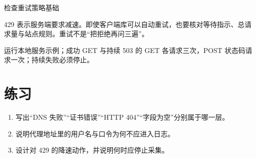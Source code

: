 \begin{example}{检查重试策略}{基础}
\end{example}

\begin{warning}
429 表示服务端要求减速。即使客户端库可以自动重试，也要核对等待指示、总请求量与站点规则。重试不是“把拒绝再问三遍”。
\end{warning}

\begin{tcolorbox}[title=本章验收,colframe=Teal,colback=Teal!3]
运行本地服务示例；成功 GET 与持续 503 的 GET 各请求三次，POST 状态码请求一次；持续失败必须停止。
\end{tcolorbox}

\section{练习}
\begin{enumerate}[label=\arabic*.]
\item 写出“DNS 失败”“证书错误”“HTTP 404”“字段为空”分别属于哪一层。
\item 说明代理地址里的用户名与口令为何不应进入日志。
\item 设计对 429 的降速动作，并说明何时应停止采集。
\end{enumerate}


